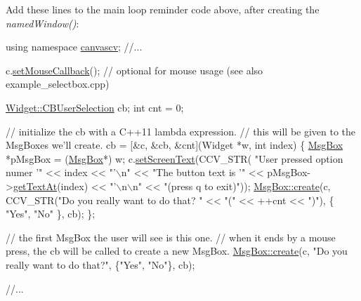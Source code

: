 Add these lines to the \textquotesingle{}main loop reminder code\textquotesingle{} above, after creating the {\itshape named\+Window()}\+: 
\begin{DoxyCode}
\textcolor{keyword}{using namespace }\hyperlink{namespacecanvascv}{canvascv};
    \textcolor{comment}{//...}

    c.\hyperlink{classcanvascv_1_1Canvas_acf6e5d4b40aec610b0dc8c4f6bf93ac1}{setMouseCallback}(); \textcolor{comment}{// optional for mouse usage (see also example\_selectbox.cpp)}

    \hyperlink{classcanvascv_1_1Widget_a977cbd39cf203c5866f07f3645c7e4bc}{Widget::CBUserSelection}  cb;
    \textcolor{keywordtype}{int} cnt = 0;

    \textcolor{comment}{// initialize the cb with a C++11 lambda expression.}
    \textcolor{comment}{// this will be given to the MsgBoxes we'll create.}
    cb = [&c, &cb, &cnt](Widget *w, \textcolor{keywordtype}{int} index)
    \{
        \hyperlink{classcanvascv_1_1MsgBox}{MsgBox} *pMsgBox = (\hyperlink{classcanvascv_1_1MsgBox}{MsgBox}*) w;
        c.\hyperlink{classcanvascv_1_1Canvas_aaedea276b82a8a4cfc0895ae81113cfd}{setScreenText}(CCV\_STR( \textcolor{stringliteral}{"User pressed option numer '"} << index << \textcolor{stringliteral}{"'\(\backslash\)n"} <<
                                 \textcolor{stringliteral}{"The button text is '"} << pMsgBox->\hyperlink{classcanvascv_1_1MsgBox_af97285a26857652a316387505ff7dce0}{getTextAt}(index) << \textcolor{stringliteral}{"'\(\backslash\)n\(\backslash\)n"} <<
                                 \textcolor{stringliteral}{"(press q to exit)"}));
        \hyperlink{classcanvascv_1_1MsgBox_a3bf0019e83e367e415da29286db2c5d0}{MsgBox::create}(c, CCV\_STR(\textcolor{stringliteral}{"Do you really want to do that? "} << \textcolor{stringliteral}{"("} << ++cnt << \textcolor{stringliteral}{")"}), 
      \{
                           \textcolor{stringliteral}{"Yes"}, \textcolor{stringliteral}{"No"}
                       \}, cb);
    \};

    \textcolor{comment}{// the first MsgBox the user will see is this one.}
    \textcolor{comment}{// when it ends by a mouse press, the cb will be called to create a new MsgBox.}
    \hyperlink{classcanvascv_1_1MsgBox_a3bf0019e83e367e415da29286db2c5d0}{MsgBox::create}(c, \textcolor{stringliteral}{"Do you really want to do that?"}, \{\textcolor{stringliteral}{"Yes"}, \textcolor{stringliteral}{"No"}\}, cb);

    \textcolor{comment}{//...}
\end{DoxyCode}


